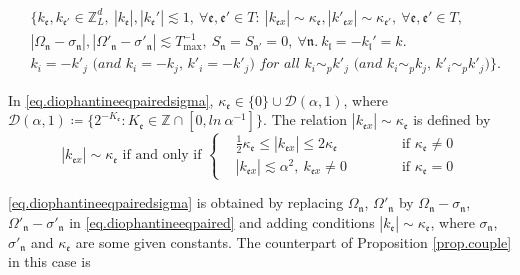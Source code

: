 \begin{equation}\label{eq.diophantineeqpairedsigma}
\begin{split}
    &\{k_{\mathfrak{e}}, k_{\mathfrak{e}'}\in \mathbb{Z}^d_L,\ |k_{\mathfrak{e}}|, |k_{\mathfrak{e}}'|\lesssim 1,\ \forall \mathfrak{e},\mathfrak{e}'\in T:\  |k_{\mathfrak{e}x}|\sim \kappa_{\mathfrak{e}}, |k'_{\mathfrak{e}x}|\sim \kappa_{\mathfrak{e}'},\ \forall \mathfrak{e},\mathfrak{e}'\in T, 
    \\
    &|\Omega_{\mathfrak{n}}-\sigma_{\mathfrak{n}}|,|\Omega'_{\mathfrak{n}}-\sigma'_{\mathfrak{n}}|\lesssim T^{-1}_{\text{max}},\ S_{\mathfrak{n}}=S_{\mathfrak{n}'}=0,\ \forall \mathfrak{n}.\ k_{\mathfrak{l}}=-k_{\mathfrak{l}}'=k.
    \\
    &\textit{$k_{i}=-k'_{j}$ (and $k_{i}=-k_{j}$, $k'_{i}=-k'_{j}$) for all $k_{i}\sim_{p}k'_{j}$ (and $k_{i}\sim_{p}k_{j}$, $k'_{i}\sim_{p}k'_{j}$)}\}.
\end{split}
\end{equation}

In \eqref{eq.diophantineeqpairedsigma}, $\kappa_{\mathfrak{e}}\in \{0\}\cup  \mathcal{D}(\alpha,1)$, where $\mathcal{D}(\alpha,1)\coloneqq\{2^{-K_{\mathfrak{e}}}:K_{\mathfrak{e}}\in  \mathbb{Z}\cap [0,ln\ \alpha^{-1}]\}$. The relation $|k_{\mathfrak{e}x}|\sim \kappa_{\mathfrak{e}}$ is defined by 
\begin{equation}\label{eq.kappa}
    |k_{\mathfrak{e}x}|\sim \kappa_{\mathfrak{e}}\text{ if and only if }\left\{\begin{aligned}
        & \frac{1}{2}\kappa_{\mathfrak{e}}\le  |k_{\mathfrak{e}x}|\le 2\kappa_{\mathfrak{e}} \qquad && \text{ if  $\kappa_{\mathfrak{e}}\ne 0$}
        \\[1em]
        &  |k_{\mathfrak{e}x}|\lesssim \alpha^2,\ k_{\mathfrak{e}x}\ne 0   \qquad && \text{ if  $\kappa_{\mathfrak{e}}= 0$}
    \end{aligned}
    \right.
\end{equation}

\eqref{eq.diophantineeqpairedsigma} is obtained by replacing $\Omega_{\mathfrak{n}}$, $\Omega'_{\mathfrak{n}}$ by $\Omega_{\mathfrak{n}}-\sigma_{\mathfrak{n}}$, $\Omega'_{\mathfrak{n}}-\sigma'_{\mathfrak{n}}$ in \eqref{eq.diophantineeqpaired} and adding conditions $|k_{\mathfrak{e}}|\sim \kappa_{\mathfrak{e}}$, where  $\sigma_{\mathfrak{n}}$, $\sigma'_{\mathfrak{n}}$ and $\kappa_{\mathfrak{e}}$ are some given constants. The counterpart of Proposition \ref{prop.couple} in this case is

